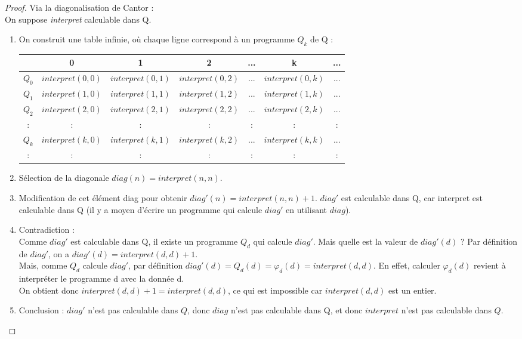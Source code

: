 \begin{proof} Via la diagonalisation de Cantor : \\
On suppose \textit{interpret} calculable dans Q.
\begin{enumerate}
	\item On construit une table infinie, où chaque ligne correspond à un programme $Q_k$ de Q : \\
		\begin{tabular}{|c||c|c|c|c|c|c|}
			\hline
			& 0 & 1 & 2 & ... & k & ... \\
			\hline
			$Q_0$ & $interpret(0,0)$ & $interpret(0,1)$ & $interpret(0,2)$ & ... & $interpret(0,k)$ & ... \\
			$Q_1$ & $interpret(1,0)$ & $interpret(1,1)$ & $interpret(1,2)$ & ... & $interpret(1,k)$ & ... \\
			$Q_2$ & $interpret(2,0)$ & $interpret(2,1)$ & $interpret(2,2)$ & ... & $interpret(2,k)$ & ... \\
			: & : &:& : & : & : &:\\
			$Q_k$ & $interpret(k,0)$ & $interpret(k,1)$ & $interpret(k,2)$ & ... & $interpret(k,k)$ & ... \\
			: & : &:& : & : & : &:\\
			\hline
		\end{tabular}
	\item Sélection de la diagonale
		$diag(n) = interpret(n,n)$.
	\item Modification de cet élément diag pour obtenir
		$diag'(n) = interpret(n,n)+1$.
		$diag'$ est calculable dans Q, car interpret est calculable dans Q (il y a moyen
		d'écrire un programme qui calcule $diag'$ en utilisant $diag$).

	\item Contradiction :\\
	       	Comme $diag'$ est calculable dans Q, il existe un programme $Q_d$ qui calcule $diag'$.
		Mais quelle est la valeur de $diag'(d)$ ?
		Par définition de $diag'$, on a $diag'(d) = interpret(d,d)+1$. \\
		Mais, comme $Q_d$ calcule $diag'$, par définition $diag'(d) = Q_d(d) = \varphi_d(d) = interpret(d,d)$.
		En effet, calculer $\varphi_d(d)$ revient à interpréter le programme
		d avec la donnée d. \\
		On obtient donc $interpret(d,d)+1 = interpret(d,d)$, ce qui est impossible car $interpret(d,d)$ est un entier.
	\item Conclusion : $diag'$ n'est pas calculable dans $Q$, donc $diag$
	n'est pas calculable dans Q, et donc $interpret$ n'est pas calculable dans $Q$.
\end{enumerate}
\end{proof}

